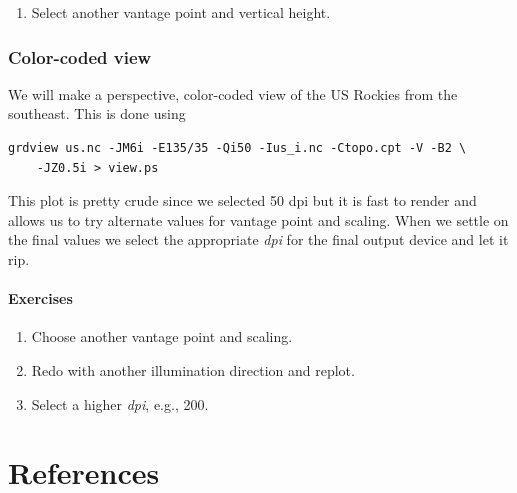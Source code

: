 \documentclass{report}
\begin{document}
\begin{enumerate}

\item Select another vantage point and vertical height.

\end{enumerate}

\subsection{Color-coded view}

We will make a perspective, color-coded view of the US Rockies
from the southeast.  This is done using

{\small\begin{verbatim}
grdview us.nc -JM6i -E135/35 -Qi50 -Ius_i.nc -Ctopo.cpt -V -B2 \
    -JZ0.5i > view.ps
\end{verbatim}
}

\noindent
This plot is pretty crude since we selected 50 dpi but it is fast
to render and allows us to try alternate values for vantage point
and scaling.  When we settle on the final values we select the
appropriate {\it dpi} for the final output device and let it rip.

\subsubsection{Exercises}

\begin{enumerate}

\item Choose another vantage point and scaling.

\item Redo  with another illumination direction and replot.

\item Select a higher {\it dpi}, e.g., 200.

\end{enumerate}

\chapter{References} 
\thispagestyle{headings}
\end{document}
